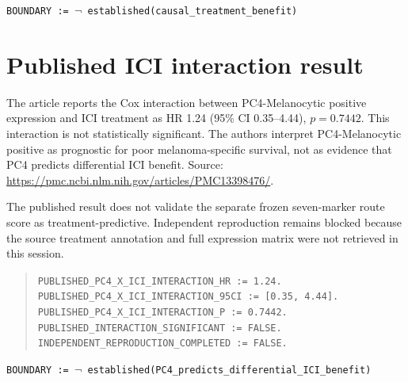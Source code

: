 \documentclass[11pt]{article}
\begin{document}
\texttt{BOUNDARY := $\neg$ established(causal\_treatment\_benefit)}

\section{Published ICI interaction result}

The article reports the Cox interaction between PC4-Melanocytic positive
expression and ICI treatment as HR 1.24 (95\% CI 0.35--4.44), $p=0.7442$.
This interaction is not statistically significant. The authors interpret
PC4-Melanocytic positive as prognostic for poor melanoma-specific survival,
not as evidence that PC4 predicts differential ICI benefit. Source:
\url{https://pmc.ncbi.nlm.nih.gov/articles/PMC13398476/}.

The published result does not validate the separate frozen seven-marker route
score as treatment-predictive. Independent reproduction remains blocked
because the source treatment annotation and full expression matrix were not
retrieved in this session.

\begin{quote}
\texttt{PUBLISHED\_PC4\_X\_ICI\_INTERACTION\_HR := 1.24.}\\
\texttt{PUBLISHED\_PC4\_X\_ICI\_INTERACTION\_95CI := [0.35, 4.44].}\\
\texttt{PUBLISHED\_PC4\_X\_ICI\_INTERACTION\_P := 0.7442.}\\
\texttt{PUBLISHED\_INTERACTION\_SIGNIFICANT := FALSE.}\\
\texttt{INDEPENDENT\_REPRODUCTION\_COMPLETED := FALSE.}
\end{quote}

\texttt{BOUNDARY := $\neg$ established(PC4\_predicts\_differential\_ICI\_benefit)}
\end{document}
